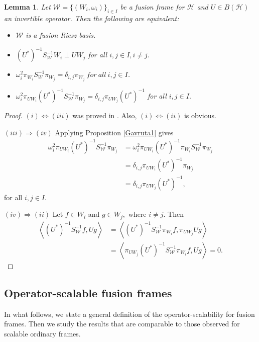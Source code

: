 \documentclass[sn-mathphys-num]{sn-jnl}%
\newtheorem{lemma}[theorem]{Lemma}
\theoremstyle{definition}
\theoremstyle{remark}
\numberwithin{equation}{section}
\begin{document}
\begin{lemma}\label{r.e}
Let $\mathcal{W}=\{(W_{i},\omega_{i})\}_{i \in I} $ be a fusion frame for $\mathcal {H}$ and $U \in B(\mathcal{H})$ an invertible operator. Then the following are equivalent:
\begin{itemize}
\item[$(i)$] $\mathcal{W}$ is a fusion Riesz basis.
\item[$(ii)$] $ \left( U^*\right) ^{-1}S_{\mathcal{W}}^{-1}W_{i}\perp UW_{j}$ for all $i,j \in I, i\neq j. $
\item[$(iii)$] $ \omega_{i}^{2}\pi_{W_{i}}S_{W}^{-1}\pi_{W_{j}}=\delta_{i,j}\pi_{W_{j}}~ for~all~ i , j \in I $.
\item[$(iv)$] $\omega_{i}^{2}\pi_{UW_{i}}\left( U^*\right) ^{-1}S_{\mathcal{W}}^{-1}\pi_{W_{j}}=\delta_{i,j}\pi_{UW_{j}}\left( U^*\right) ^{-1}$ for all $i,j \in I.$
\end{itemize}
\end{lemma}

\begin{proof}
$(i) \Leftrightarrow (iii)$ was proved in \cite[Proposition 2.4]{mitra sh.}. Also, $(i) \Leftrightarrow (ii)$ is obvious.
 
$(iii) \Rightarrow (iv)$ Applying Proposition \ref{Gavruta1} gives 
\begin{align*}
\omega_{i}^{2}\pi_{UW_{i}}\left( U^*\right) ^{-1}S_{\mathcal{W}}^{-1}\pi_{W_{j}}&=\omega_{i}^{2}\pi_{UW_{i}}\left( U^*\right) ^{-1}\pi_{W_{i}}S_{\mathcal{W}}^{-1}\pi_{W_{j}}
\\&=\delta_{i,j}\pi_{UW_{i}}\left( U^*\right) ^{-1}\pi_{W_{j}}
\\&=\delta_{i,j}\pi_{UW_{j}}\left( U^*\right) ^{-1},
\end{align*}
for all $i,j \in I.$


$(iv) \Rightarrow (ii)$ Let $f \in W_{i}$ and $g \in W_{j},$ where $i\neq j$. Then
\begin{align*}
\left\langle \left( U^*\right) ^{-1}S_{\mathcal{W}}^{-1}f,Ug \right\rangle &=\left\langle \left( U^*\right) ^{-1}S_{\mathcal{W}}^{-1}\pi_{W_{i}}f,\pi_{UW_{j}}Ug \right\rangle 
\\&=\left\langle \pi_{UW_{j}}\left( U^*\right) ^{-1}S_{\mathcal{W}}^{-1}\pi_{W_{i}}f,Ug \right\rangle =0.
\end{align*}
\end{proof}

\subsection{Operator-scalable fusion frames}
In what follows, we state a general definition of the operator-scalability for fusion frames. Then we study the results that are comparable to those observed for scalable ordinary frames.
\end{document}
